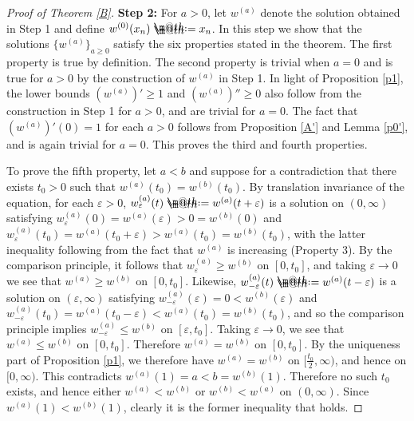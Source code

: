\documentclass[12pt]{article}
\makeatletter
\numberwithin{equation}{section}
\theoremstyle{plain}
\theoremstyle{definition}
\newcommand{\ep}{\varepsilon}
\newcommand*{\defeq}{\mathrel{\rlap{%
			\raisebox{0.3ex}{$\m@th\cdot$}}%
		\raisebox{-0.3ex}{$\m@th\cdot$}}%
	=}
\makeatother
\begin{document}
\begin{proof}[Proof of Theorem \ref{B}]
	
	\noindent\textbf{Step 2:} For $a>0$, let $w^{(a)}$ denote the solution obtained in Step 1 and define $w^{(0)}(x_n) \defeq x_n$. In this step we show that the solutions $\{w^{(a)}\}_{a \geq 0}$ satisfy the six properties stated in the theorem. The first property is true by definition. The second property is trivial when $a=0$ and is true for $a>0$ by the construction of $w^{(a)}$ in Step 1. In light of Proposition \ref{p1}, the lower bounds $(w^{(a)})' \geq 1$ and $(w^{(a)})'' \geq 0$ also follow from the construction in Step 1 for $a>0$, and are trivial for $a=0$. The fact that $(w^{(a)})'(0)=1$ for each $a>0$ follows from Proposition \ref{A'} and Lemma \ref{p0'}, and is again trivial for $a=0$. This proves the third and fourth properties.  \medskip 
	
	To prove the fifth property, let $a<b$ and suppose for a contradiction that there exists $t_0>0$ such that $w^{(a)}(t_0) = w^{(b)}(t_0)$. By translation invariance of the equation, for each $\ep>0$, $w^{(a)}_\ep(t) \defeq w^{(a)}(t+\ep)$ is a solution on $(0,\infty)$ satisfying $w^{(a)}_\ep(0) = w^{(a)}(\ep) > 0 = w^{(b)}(0)$ and $w^{(a)}_\ep(t_0) = w^{(a)}(t_0+\ep) > w^{(a)}(t_0) = w^{(b)}(t_0)$, with the latter inequality following from the fact that $w^{(a)}$ is increasing (Property 3). By the comparison principle, it follows that $w^{(a)}_\ep \geq w^{(b)}$ on $[0,t_0]$, and taking $\ep\rightarrow 0$ we see that $w^{(a)} \geq w^{(b)}$ on $[0,t_0]$. Likewise, $w^{(a)}_{-\ep}(t) \defeq w^{(a)}(t-\ep)$ is a solution on $(\ep,\infty)$ satisfying $w^{(a)}_{-\ep}(\ep) = 0 < w^{(b)}(\ep)$ and $w^{(a)}_{-\ep}(t_0) = w^{(a)}(t_0-\ep)< w^{(a)}(t_0) = w^{(b)}(t_0)$, and so the comparison principle implies $w^{(a)}_{-\ep} \leq w^{(b)}$ on $[\ep,t_0]$. Taking $\ep\rightarrow 0$, we see that $w^{(a)} \leq w^{(b)}$ on $[0,t_0]$. Therefore $w^{(a)} = w^{(b)}$ on $[0,t_0]$. By the uniqueness part of Proposition \ref{p1}, we therefore have $w^{(a)} = w^{(b)}$ on $[\frac{t_0}{2},\infty)$, and hence on $[0,\infty)$. This contradicts $w^{(a)}(1) = a < b = w^{(b)}(1)$. Therefore no such $t_0$ exists, and hence either $w^{(a)}<w^{(b)}$ or $w^{(b)}<w^{(a)}$ on $(0,\infty)$. Since $w^{(a)}(1)<w^{(b)}(1)$, clearly it is the former inequality that holds. \medskip 
	

\end{proof}
\end{document}
